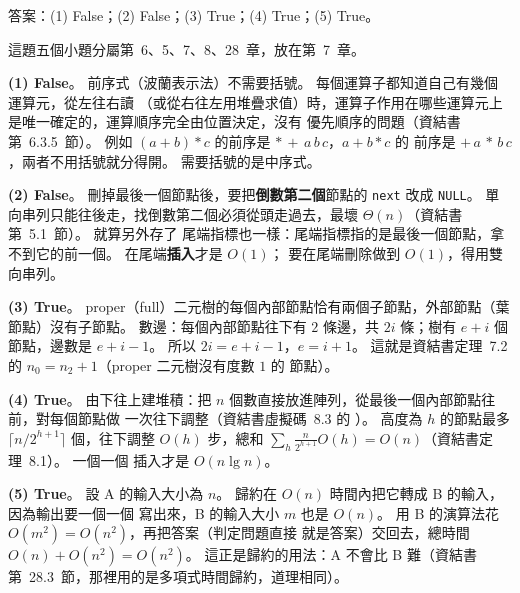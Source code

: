 \begin{pastsoln}
答案：(1) False；(2) False；(3) True；(4) True；(5) True。

這題五個小題分屬第~6、5、7、8、28~章，放在第~7~章。

\textbf{(1) False}。 前序式（波蘭表示法）不需要括號。 每個運算子都知道自己有幾個運算元，從左往右讀
（或從右往左用堆疊求值）時，運算子作用在哪些運算元上是唯一確定的，運算順序完全由位置決定，沒有
優先順序的問題（資結書第~6.3.5~節）。 例如 $(a + b) * c$ 的前序是 $*\,{+}\,a\,b\,c$，$a + b * c$ 的
前序是 $+\,a\,{*}\,b\,c$，兩者不用括號就分得開。 需要括號的是中序式。

\textbf{(2) False}。 刪掉最後一個節點後，要把\textbf{倒數第二個}節點的 \texttt{next} 改成 \texttt{NULL}。
單向串列只能往後走，找倒數第二個必須從頭走過去，最壞 $\Theta(n)$（資結書第~5.1~節）。 就算另外存了
尾端指標也一樣：尾端指標指的是最後一個節點，拿不到它的前一個。 在尾端\textbf{插入}才是 $O(1)$；
要在尾端刪除做到 $O(1)$，得用雙向串列。

\textbf{(3) True}。 proper（full）二元樹的每個內部節點恰有兩個子節點，外部節點（葉節點）沒有子節點。
數邊：每個內部節點往下有 $2$ 條邊，共 $2i$ 條；樹有 $e + i$ 個節點，邊數是 $e + i - 1$。 所以
$2i = e + i - 1$，$e = i + 1$。 這就是資結書定理~7.2 的 $n_0 = n_2 + 1$（proper 二元樹沒有度數 $1$ 的
節點）。

\textbf{(4) True}。 由下往上建堆積：把 $n$ 個數直接放進陣列，從最後一個內部節點往前，對每個節點做
一次往下調整（資結書虛擬碼~8.3 的 ）。 高度為 $h$ 的節點最多 $\lceil n/2^{h+1}
\rceil$ 個，往下調整 $O(h)$ 步，總和 $\sum_h \frac{n}{2^{h+1}} O(h) = O(n)$（資結書定理~8.1）。 一個一個
插入才是 $O(n \lg n)$。

\textbf{(5) True}。 設 A 的輸入大小為 $n$。 歸約在 $O(n)$ 時間內把它轉成 B 的輸入，因為輸出要一個一個
寫出來，B 的輸入大小 $m$ 也是 $O(n)$。 用 B 的演算法花 $O(m^2) = O(n^2)$，再把答案（判定問題直接
就是答案）交回去，總時間 $O(n) + O(n^2) = O(n^2)$。 這正是歸約的用法：A 不會比 B 難（資結書
第~28.3~節，那裡用的是多項式時間歸約，道理相同）。
\end{pastsoln}
